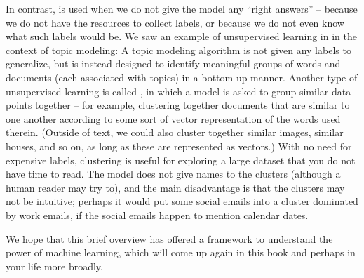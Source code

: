 In contrast,  is used when we do not give the model any ``right answers'' -- because we do not have the resources to collect labels, or because we do not even know what such labels would be.  We saw an example of unsupervised learning in  in the context of topic modeling: A topic modeling algorithm is not given any labels to generalize, but is instead designed to identify meaningful groups of words and documents (each associated with topics) in a bottom-up manner.  Another type of unsupervised learning is called , in which a model is asked to group similar data points together -- for example, clustering together documents that are similar to one another according to some sort of vector representation of the words used therein.   (Outside of text, we could also cluster together similar images, similar houses, and so on, as long as these are represented as vectors.)  With no need for expensive labels, clustering is useful for exploring a large dataset that you do not have time to read.  The model does not give names to the clusters (although a human reader may try to), and the main disadvantage is that the clusters may not be intuitive; perhaps it would put some social emails into a cluster dominated by work emails, if the social emails happen to mention calendar dates.

We hope that this brief overview has offered a framework to understand the power of machine learning, which will come up again in this book and perhaps in your life more broadly.



